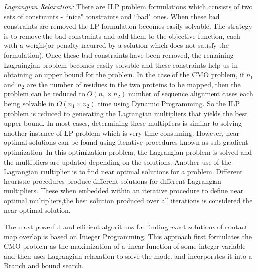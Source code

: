 \begin{noindlist}
\item {\it Lagrangian Relaxation:} There are ILP problem formulations which consists of two sets of constraints - ``nice" constraints and ``bad" ones. When these bad constraints are removed the LP formulation becomes easily solvable. The strategy is to remove the bad constraints and add them to the objective function, each with a weight(or penalty incurred by a solution which does not satisfy the formulation). Once these bad constraints have been removed, the remaining Lagraingian problem becomes easily solvable and these constraints help us in obtaining an upper bound for the problem. In the case of the CMO problem, if $n_1$ and $n_2$ are the number of residues in the two proteins to be mapped, then the problem can be reduced to $O(n_1\times n_2)$ number of sequence alignment cases each being solvable in $O(n_1\times n_2)$ time using Dynamic Programming. So the ILP problem is reduced to generating the Lagrangian multipliers that yields the best upper bound. In most cases, determining these multipliers is similar to solving another instance of LP problem which is very time consuming. However, near optimal solutions  can be found using iterative procedures known as sub-gradient optimization. In this optimization problem, the Lagrangian problem is solved and the multipliers are updated depending on the solutions. Another use of the Lagrangian multiplier is to find near optimal solutions for a problem. Different heuristic procedures produce different solutions for different Lagrangian multipliers. These when embedded within an iterative procedure to define near optimal multipliers,the best solution produced over all iterations is considered the near optimal solution.
\end{noindlist}

The most powerful and efficient algorithms for finding exact solutions of contact map overlap is based on Integer Programming. This approach first formulates the CMO problem as the maximization of a linear function of some integer variable and then uses Lagrangian relaxation to solve the model and incorporates it into a Branch and bound search.



